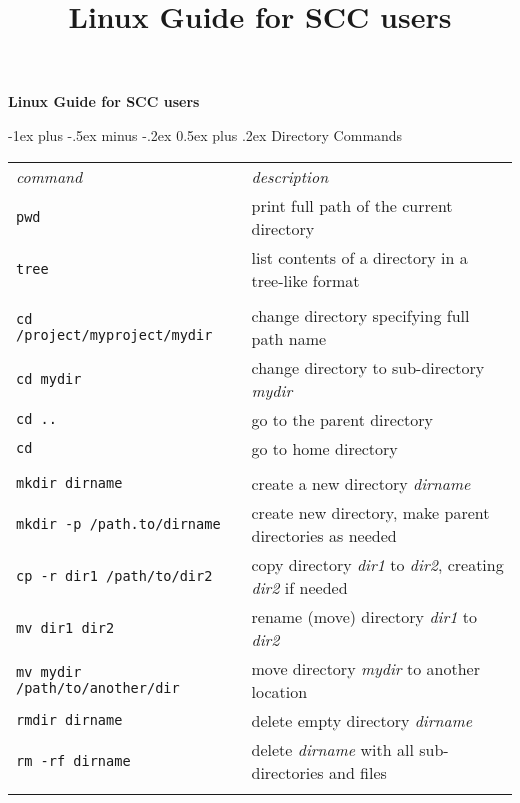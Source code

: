 \documentclass[10pt,landscape]{article}
\title{ Linux Guide for SCC users}
\makeatletter
\renewcommand{\section}{\@startsection{section}{1}{0mm}%
                                {-1ex plus -.5ex minus -.2ex}%
                                {0.5ex plus .2ex}%
                                {\normalfont\large\bfseries}}
\makeatother
\begin{document}
\raggedright
\footnotesize

\begin{center}
     \LARGE{\textbf{ Linux Guide for SCC users}} \\
\end{center}

\begin{multicols}{2}
\setlength{\premulticols}{1pt}
\setlength{\postmulticols}{1pt}
\setlength{\multicolsep}{1pt}
\setlength{\columnsep}{1pt}

\section{Directory Commands}
\begin{tabular}{ll}
\emph{command} & \emph{description} \\

\verb!pwd! & print full path of the current directory\\
\verb!tree! & list contents of a directory in a tree-like format\\\\
\texttt{cd /project/myproject/mydir} & change directory specifying full path name\\
\texttt{cd mydir} & change directory to sub-directory \textit{mydir}\\
\texttt{cd ..} & go to the parent directory\\
\texttt{cd } & go to home directory\\
\\
\texttt{mkdir dirname } & create a new directory \textit{dirname}\\
\texttt{mkdir -p /path.to/dirname } & create new directory, make parent directories as needed\\
\texttt{cp -r dir1 /path/to/dir2} & copy directory \textit{dir1} to \textit{dir2}, creating \textit{dir2} if needed\\
\texttt{mv dir1 dir2} & rename (move) directory \textit{dir1} to \textit{dir2}\\
\texttt{mv mydir /path/to/another/dir} & move directory \textit{mydir} to another location\\ 
\texttt{rmdir dirname } & delete empty directory \textit{dirname}\\
\texttt{rm -rf dirname } & delete \textit{dirname} with all sub-directories and files\\\\
\end{tabular}



\end{multicols}
\end{document}
